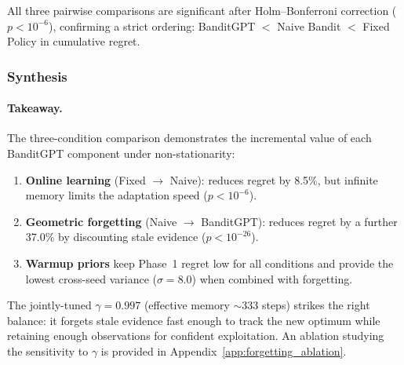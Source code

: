 \noindent
All three pairwise comparisons are significant after
Holm--Bonferroni correction ($p < 10^{-6}$), confirming
a strict ordering:
BanditGPT $<$ Naive Bandit $<$ Fixed Policy in cumulative regret.


\subsubsection{Synthesis}
\label{sec:nonstat_synthesis}

\paragraph{Takeaway.}
The three-condition comparison demonstrates the incremental
value of each BanditGPT component under non-stationarity:
\begin{enumerate}[nosep,leftmargin=*]
  \item \textbf{Online learning} (Fixed $\to$ Naive):
    reduces regret by 8.5\%, but infinite memory limits
    the adaptation speed ($p < 10^{-6}$).
  \item \textbf{Geometric forgetting} (Naive $\to$ BanditGPT):
    reduces regret by a further 37.0\% by discounting stale
    evidence ($p < 10^{-26}$).
  \item \textbf{Warmup priors} keep Phase~1 regret low for all
    conditions and provide the lowest cross-seed variance
    ($\sigma{=}8.0$) when combined with forgetting.
\end{enumerate}

\noindent
The jointly-tuned $\gamma{=}0.997$ (effective memory ${\sim}333$
steps) strikes the right balance: it forgets stale evidence
fast enough to track the new optimum while retaining enough
observations for confident exploitation.
An ablation studying the sensitivity to $\gamma$ is provided
in Appendix~\ref{app:forgetting_ablation}.
